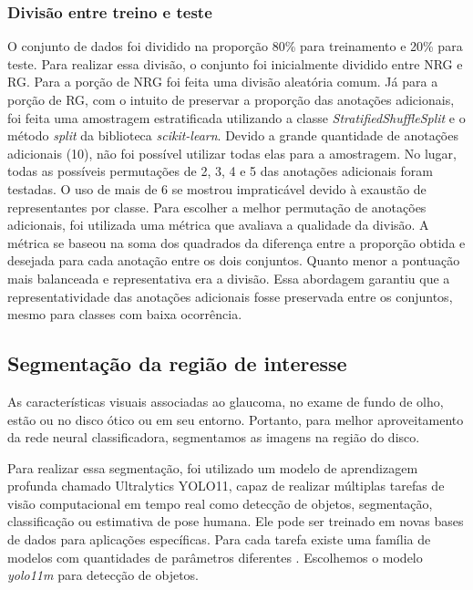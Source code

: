 \documentclass[12pt]{article}
\begin{document}
\subsubsection{Divisão entre treino e teste}
\label{sec:dataset:split}

O conjunto de dados foi dividido na proporção 80\% para treinamento e 20\% para teste. Para realizar essa divisão, o conjunto foi inicialmente dividido entre NRG e RG. Para a porção de NRG foi feita uma divisão aleatória comum. Já para a porção de RG, com o intuito de preservar a proporção das anotações adicionais, foi feita uma amostragem estratificada utilizando a classe \emph{StratifiedShuffleSplit} e o método \emph{split} da biblioteca \emph{scikit-learn}. Devido a grande quantidade de anotações adicionais (10), não foi possível utilizar todas elas para a amostragem. No lugar, todas as possíveis permutações de 2, 3, 4 e 5 das anotações adicionais foram testadas. O uso de mais de 6 se mostrou impraticável devido à exaustão de representantes por classe. Para escolher a melhor permutação de anotações adicionais, foi utilizada uma métrica que avaliava a qualidade da divisão. A métrica se baseou na soma dos quadrados da diferença entre a proporção obtida e desejada para cada anotação entre os dois conjuntos. Quanto menor a pontuação mais balanceada e representativa era a divisão. Essa abordagem garantiu que a representatividade das anotações adicionais fosse preservada entre os conjuntos, mesmo para classes com baixa ocorrência.

\subsection{Segmentação da região de interesse}
\label{sec:segmentation}

As características visuais associadas ao glaucoma, no exame de fundo de olho, estão ou no disco ótico ou em seu entorno. Portanto, para melhor aproveitamento da rede neural classificadora, segmentamos as imagens na região do disco.

Para realizar essa segmentação, foi utilizado um modelo de aprendizagem profunda chamado Ultralytics YOLO11, capaz de realizar múltiplas tarefas de visão computacional em tempo real como detecção de objetos, segmentação, classificação ou estimativa de pose humana. Ele pode ser treinado em novas bases de dados para aplicações específicas. Para cada tarefa existe uma família de modelos com quantidades de parâmetros diferentes \cite{YOLO_2023}. Escolhemos o modelo \emph{yolo11m} para detecção de objetos.
\end{document}
